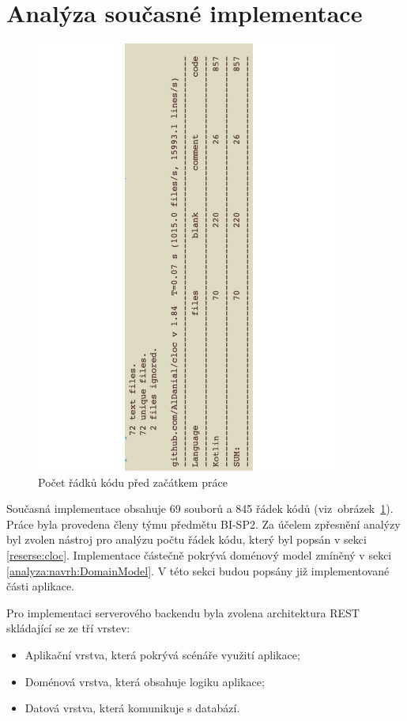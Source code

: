 \section{Analýza současné implementace}\label{analyza:soucasnaImplementace}
    \begin{figure}\centering
	   \includegraphics[angle=-90, width=0.9\textwidth]{pdfs/Cloc1}
	   \caption[Počet řádků kódu před začátkem práce]{Počet řádků kódu před začátkem práce}\label{image:cloc1}
    \end{figure}
    Současná implementace obsahuje 69 souborů a 845 řádek kódů (viz~obrázek~\ref{image:cloc1}). Práce byla provedena členy týmu předmětu BI-SP2. Za účelem zpřesnění analýzy byl zvolen nástroj pro analýzu počtu řádek kódu, který byl popsán v sekci \ref{reserse:cloc}. Implementace částečně pokrývá doménový model zmíněný v sekci \ref{analyza:navrh:DomainModel}. V této sekci budou popsány již implementované části aplikace. 
     
    Pro implementaci serverového backendu byla zvolena architektura REST skládající se ze tří vrstev:
    \begin{itemize}
         \item Aplikační vrstva, která pokrývá scénáře využití aplikace;
         \item Doménová vrstva, která obsahuje logiku aplikace;
         \item Datová vrstva, která komunikuje s databází.
    \end{itemize}
    
